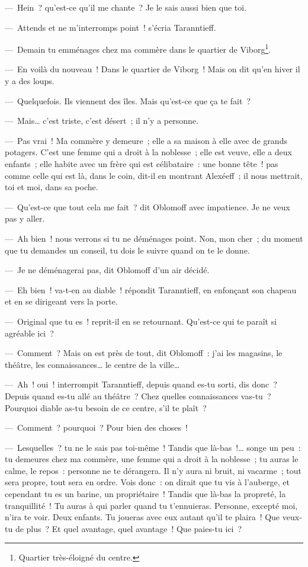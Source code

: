 \documentclass[french,twoside]{book} %
\begin{document}
— Hein ? qu’est-ce qu’il me chante ? Je le sais aussi bien que toi.\par
— Attends et ne m’interromps point ! s’écria Taranntieff.\par
— Demain tu emménages chez ma commère dans le quartier de Viborg\footnote{Quartier très-éloigné du centre.}.\par
— En voilà du nouveau ! Dans le quartier de Viborg ! Mais on dit qu’en hiver il y a des loups.\par
— Quelquefois. Ils viennent des îles. Mais qu’est-ce que ça te fait ?\par
— Mais… c’est triste, c’est désert ; il n’y a personne.\par
— Pas vrai ! Ma commère y demeure ; elle a sa maison à elle avec de grands potagers. C’est une femme qui a droit à la noblesse ; elle est veuve, elle a deux enfants ; elle habite avec un frère qui est célibataire : une bonne tête ! pas comme celle qui est là, dans le coin, dit-il en montrant Alexéeff ; il nous mettrait, toi et moi, dans sa poche.\par
— Qu’est-ce que tout cela me fait ? dit Oblomoff avec impatience. Je ne veux pas y aller.\par
— Ah bien ! nous verrons si tu ne déménages point. Non, mon cher ; du moment que tu demandes un conseil, tu dois le suivre quand on te le donne.\par
— Je ne déménagerai pas, dit Oblomoff d’un air décidé.\par
— Eh bien ! va-t-en au diable ! répondit Taranntieff, en enfonçant son chapeau et en se dirigeant vers la porte.\par
— Original que tu es ! reprit-il en se retournant. Qu’est-ce qui te paraît si agréable ici ?\par
— Comment ? Mais on est près de tout, dit Oblomoff : j’ai les magasins, le théâtre, les connaissances… le centre de la ville…\par
— Ah ! oui ! interrompit Taranntieff, depuis quand es-tu sorti, dis donc ? Depuis quand es-tu allé au théâtre ? Chez quelles connaissances vas-tu ? Pourquoi diable as-tu besoin de ce centre, s’il te plaît ?\par
— Comment ? pourquoi ? Pour bien des choses !\par
— Lesquelles ? tu ne le sais pas toi-même ! Tandis que là-bas !… songe un peu : tu demeures chez ma commère, une femme qui a droit à la noblesse ; tu auras le calme, le repos : personne ne te dérangera. Il n’y aura ni bruit, ni vacarme ; tout sera propre, tout sera en ordre. Vois donc : on dirait que tu vis à l’auberge, et cependant tu es un barine, un propriétaire ! Tandis que là-bas la propreté, la tranquillité ! Tu auras à qui parler quand tu t’ennuieras. Personne, excepté moi, n’ira te voir. Deux enfants. Tu joueras avec eux autant qu’il te plaira ! Que veux-tu de plus ? Et quel avantage, quel avantage ! Que paies-tu ici ?\par
\end{document}

